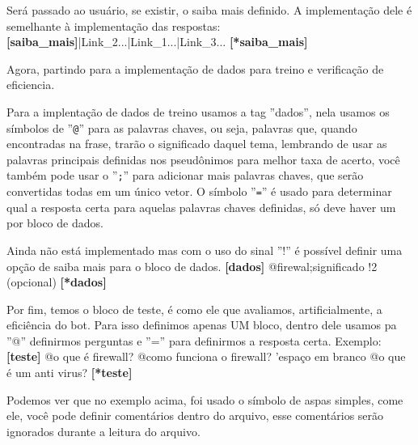    Será passado ao usuário, se existir, o saiba mais definido. A implementação dele é semelhante à implementação das respostas:\newline
    \textbf{[saiba\_mais]}|Link\_2...|Link\_1...|Link\_3...\newline
    \textbf{[*saiba\_mais]}
    \par
    Agora, partindo para a implementação de dados para treino e verificação de eficiencia.\par
    Para a implentação de dados de treino usamos a tag ''dados'', nela usamos os símbolos de ''\texttt{@}'' para as palavras chaves, ou seja, palavras que, quando encontradas na frase, trarão o significado daquel tema, lembrando de usar as palavras principais definidas nos pseudônimos para melhor taxa de acerto, você também pode usar o ''\texttt{;}'' para adicionar mais palavras chaves, que serão convertidas todas em um único vetor. O símbolo ''\texttt{=}'' é usado para determinar qual a resposta certa para aquelas palavras chaves definidas, só deve haver um por bloco de dados.\par
    Ainda não está implementado mas com o uso do sinal ''!'' é possível definir uma opção de saiba mais para o bloco de dados.\newline
    \textbf{[dados]}\newline
    @firewal;significado\newline
    !2 (opcional)\newline
    \textbf{[*dados]}\par
    Por fim, temos o bloco de teste, é como ele que avaliamos, artificialmente, a eficiência do bot. Para isso definimos apenas UM bloco, dentro dele usamos pa ''@'' definirmos perguntas e ''='' para definirmos a resposta certa. Exemplo:\newline
    \textbf{[teste]}\newline
    @o que é firewall?\newline
    @como funciona o firewall?\newline
    'espaço em branco\newline
    @o que é um anti virus?\newline
    \textbf{[*teste]}\par
    Podemos ver que no exemplo acima, foi usado o símbolo de aspas simples, come ele, você pode definir comentários dentro do arquivo, esse comentários serão ignorados durante a leitura do arquivo.
    
    
    
    
    
    
